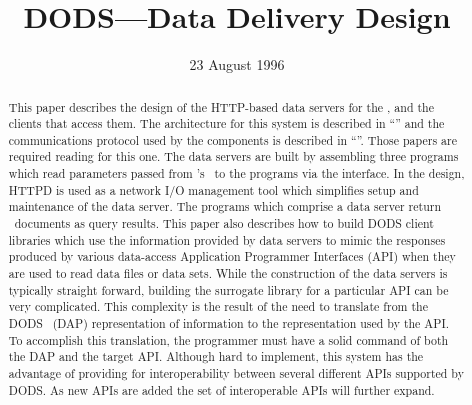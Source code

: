 
%
%







\title{DODS---Data Delivery Design}
\author{}
\date{23 August 1996} %

\maketitle

\begin{abstract}
  This paper describes the design of the HTTP-based data servers for the
  \DODS, and the clients that access them. The architecture for this system
  is described in ``\DDA'' and the communications protocol used by the
  components is described in ``\DAP''. Those papers are required reading for
  this one. The data servers are built by assembling three programs which
  read parameters passed from \NCSA's \HTTPD\ to the programs via the \CGI
  interface. In the design, HTTPD is used as a network I/O management tool
  which simplifies setup and maintenance of the data server. The programs
  which comprise a data server return \MIME\ documents as query results. This
  paper also describes how to build DODS client libraries which use the
  information provided by data servers to mimic the responses produced by
  various data-access Application Programmer Interfaces (API) when they are
  used to read data files or data sets. While the construction of the data
  servers is typically straight forward, building the surrogate library for a
  particular API can be very complicated. This complexity is the result of
  the need to translate from the DODS \Dap\ (DAP) representation of
  information to the representation used by the API\@. To accomplish this
  translation, the programmer must have a solid command of both the DAP and
  the target API\@. Although hard to implement, this system has the advantage
  of providing for interoperability between several different APIs supported
  by DODS\@. As new APIs are added the set of interoperable APIs will further
  expand.
\end{abstract}



\begin{htmlonly}
\end{htmlonly}

